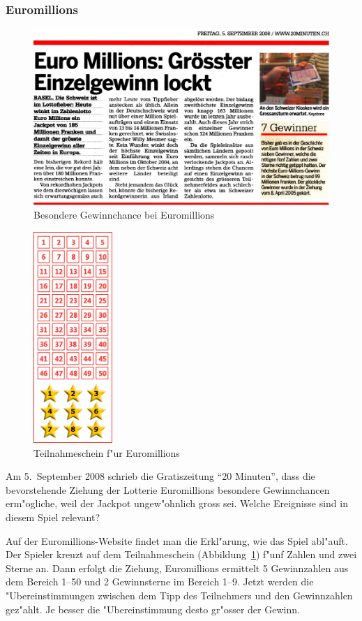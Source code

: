 \subsubsection{Euromillions}
\begin{figure}
\includegraphics[width=\hsize]{graphics/euromillions}
\caption{Besondere Gewinnchance bei Euromillions}
\end{figure}
\begin{figure}
\begin{center}
\includegraphics[height=8cm]{graphics/euromillionsschein}
\end{center}
\caption{Teilnahmeschein f"ur Euromillions\label{euromillionsschein}}
\end{figure}
Am 5.~September 2008 schrieb die Gratiszeitung ``20 Minuten'', dass die
bevorstehende Ziehung der Lotterie Euromillions besondere Gewinnchancen 
erm"ogliche, weil der Jackpot ungew"ohnlich gross sei.
Welche Ereignisse
sind in diesem Spiel relevant?

Auf der Euromillions-Website findet man die Erkl"arung, wie das Spiel abl"auft.
Der Spieler kreuzt auf dem Teilnahmeschein (Abbildung~\ref{euromillionsschein})
f"unf Zahlen und zwei Sterne an.
Dann erfolgt die Ziehung, Euromillions ermittelt
5 Gewinnzahlen aus dem Bereich 1--50 und 2 Gewinnsterne im Bereich 1--9.
Jetzt werden die "Ubereinstimmungen zwischen dem Tipp des Teilnehmers und den
Gewinnzahlen gez"ahlt.
Je besser die "Ubereinstimmung desto gr"osser der Gewinn.

